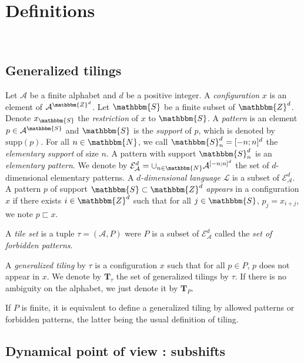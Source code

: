 \documentclass[proceedings]{stacs}
\theoremstyle{plain}\newtheorem{satz}[thm]{Satz}
\theoremstyle{definition}\newtheorem{crucial}[thm]{Crucial Definition}
\newcommand{\supp}{\mathrm{supp}}
\newcommand{\A}{\mathcal{A}}
\newcommand{\T}{\mathbf{T}}
\newcommand{\Lang}{\mathcal{L}}
\begin{document}
\section{Definitions}~\label{definition}
\vspace{-0,6cm}
	\subsection{Generalized tilings}

Let $\A$ be a finite alphabet and $d$ be a positive integer. A \emph{configuration} $x$ is an element of $\A^{\mathbbm{Z}^d}$. Let $\mathbbm{S}$ be a finite subset of $\mathbbm{Z}^d$. Denote $x_{\mathbbm{S}}$ the \emph{restriction} of $x$ to $\mathbbm{S}$. A \emph{pattern} is an element $p\in\A^{\mathbbm{S}}$  and $\mathbbm{S}$ is the \emph{support} of $p$, which is denoted by $\supp(p)$. For all $n\in\mathbbm{N}$, we call $\mathbbm{S}_n^d=[-n;n]^{d}$ the \emph{elementary support} of size $n$. A pattern with support $\mathbbm{S}_n^d$ is an \emph{elementary pattern}. We denote by $\mathcal{E}^d_{\A}=\cup_{n\in\mathbbm{N}} \A^{[-n;n]^{d}}$ the set of $d$-dimensional elementary patterns. A \emph{$d$-dimensional language} $\Lang$ is a subset of $\mathcal{E}^d_{\A}$. A pattern $p$ of support $\mathbbm{S}\subset\mathbbm{Z}^d$ \emph{appears} in a configuration $x$ if there exists $i\in\mathbbm{Z}^d$ such that for all $j\in\mathbbm{S}$, $p_j=x_{i+j}$, we note $p\sqsubset x$.

\begin{definition}
A \emph{tile set} is a tuple $\tau=(\A,P)$ were $P$ is a subset of $\mathcal{E}^d_{\A}$ called the \emph{set of forbidden patterns}.

A \emph{generalized tiling} by $\tau$ is a configuration $x$ such that for all $p\in P$, $p$ does not appear in $x$. We denote by $\T_{\tau}$ the set of generalized tilings by $\tau$. If there is no ambiguity on the alphabet, we just denote it by $\T_{P}$.
\end{definition}

\begin{remark}
If $P$ is finite, it is equivalent to define a generalized tiling by allowed patterns or forbidden patterns, the latter being the usual definition of tiling.
\end{remark}

             \subsection{Dynamical point of view : subshifts}
\end{document}
